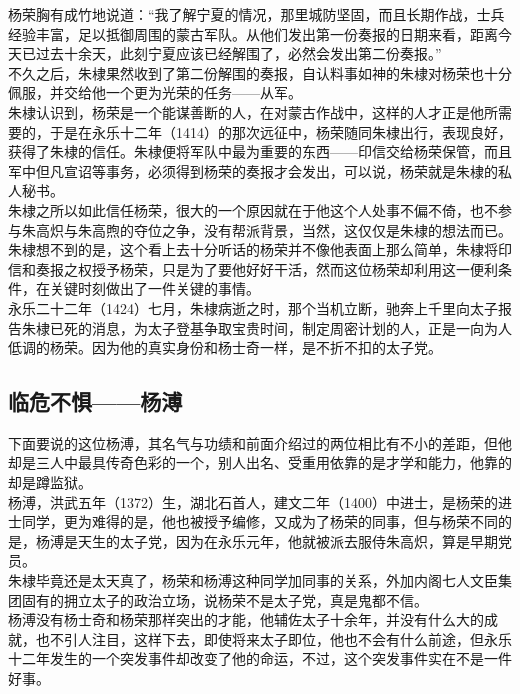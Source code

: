 \begin{multicols}{\theparacolNo}
杨荣胸有成竹地说道：“我了解宁夏的情况，那里城防坚固，而且长期作战，士兵经验丰富，足以抵御周围的蒙古军队。从他们发出第一份奏报的日期来看，距离今天已过去十余天，此刻宁夏应该已经解围了，必然会发出第二份奏报。”\\

不久之后，朱棣果然收到了第二份解围的奏报，自认料事如神的朱棣对杨荣也十分佩服，并交给他一个更为光荣的任务——从军。\\

朱棣认识到，杨荣是一个能谋善断的人，在对蒙古作战中，这样的人才正是他所需要的，于是在永乐十二年（1414）的那次远征中，杨荣随同朱棣出行，表现良好，获得了朱棣的信任。朱棣便将军队中最为重要的东西——印信交给杨荣保管，而且军中但凡宣诏等事务，必须得到杨荣的奏报才会发出，可以说，杨荣就是朱棣的私人秘书。\\

朱棣之所以如此信任杨荣，很大的一个原因就在于他这个人处事不偏不倚，也不参与朱高炽与朱高煦的夺位之争，没有帮派背景，当然，这仅仅是朱棣的想法而已。\\

朱棣想不到的是，这个看上去十分听话的杨荣并不像他表面上那么简单，朱棣将印信和奏报之权授予杨荣，只是为了要他好好干活，然而这位杨荣却利用这一便利条件，在关键时刻做出了一件关键的事情。\\

永乐二十二年（1424）七月，朱棣病逝之时，那个当机立断，驰奔上千里向太子报告朱棣已死的消息，为太子登基争取宝贵时间，制定周密计划的人，正是一向为人低调的杨荣。因为他的真实身份和杨士奇一样，是不折不扣的太子党。\\

\subsection{临危不惧——杨溥}
下面要说的这位杨溥，其名气与功绩和前面介绍过的两位相比有不小的差距，但他却是三人中最具传奇色彩的一个，别人出名、受重用依靠的是才学和能力，他靠的却是蹲监狱。\\

杨溥，洪武五年（1372）生，湖北石首人，建文二年（1400）中进士，是杨荣的进士同学，更为难得的是，他也被授予编修，又成为了杨荣的同事，但与杨荣不同的是，杨溥是天生的太子党，因为在永乐元年，他就被派去服侍朱高炽，算是早期党员。\\

朱棣毕竟还是太天真了，杨荣和杨溥这种同学加同事的关系，外加内阁七人文臣集团固有的拥立太子的政治立场，说杨荣不是太子党，真是鬼都不信。\\

杨溥没有杨士奇和杨荣那样突出的才能，他辅佐太子十余年，并没有什么大的成就，也不引人注目，这样下去，即使将来太子即位，他也不会有什么前途，但永乐十二年发生的一个突发事件却改变了他的命运，不过，这个突发事件实在不是一件好事。\\


\end{multicols}
